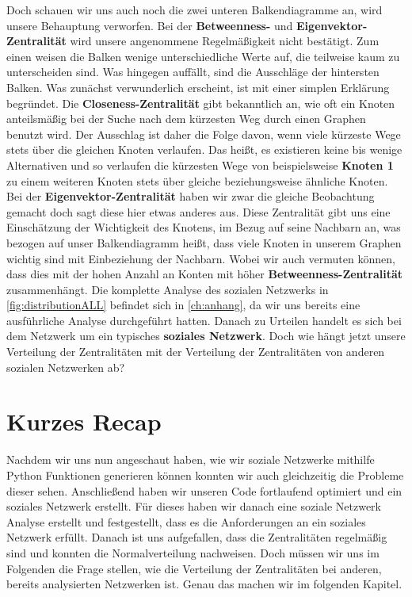 Doch schauen wir uns auch noch die zwei unteren Balkendiagramme an, wird unsere Behauptung verworfen. Bei der \textbf{Betweenness-} und \textbf{Eigenvektor-Zentralität} wird unsere angenommene Regelmäßigkeit nicht bestätigt. Zum einen weisen die Balken wenige unterschiedliche Werte auf, die teilweise kaum zu unterscheiden sind. Was hingegen auffällt, sind die Ausschläge der hintersten Balken. Was zunächst verwunderlich erscheint, ist mit einer simplen Erklärung begründet. Die \textbf{Closeness-Zentralität} gibt bekanntlich an, wie oft ein Knoten anteilsmäßig bei der Suche nach dem kürzesten Weg durch einen Graphen benutzt wird. Der Ausschlag ist daher die Folge davon, wenn viele kürzeste Wege stets über die gleichen Knoten verlaufen. Das heißt, es existieren keine bis wenige Alternativen und so verlaufen die kürzesten Wege von beispielsweise \textbf{Knoten 1} zu einem weiteren Knoten stets über gleiche beziehungsweise ähnliche Knoten. Bei der \textbf{Eigenvektor-Zentralität} haben wir zwar die gleiche Beobachtung gemacht doch sagt diese hier etwas anderes aus. Diese Zentralität gibt uns eine Einschätzung der Wichtigkeit des Knotens, im Bezug auf seine Nachbarn an, was bezogen auf unser Balkendiagramm heißt, dass viele Knoten in unserem Graphen wichtig sind mit Einbeziehung der Nachbarn. Wobei wir auch vermuten können, dass dies mit der hohen Anzahl an Konten mit höher \textbf{Betweenness-Zentralität} zusammenhängt. 
Die komplette Analyse des sozialen Netzwerks in \ref{fig:distributionALL} befindet sich in \ref{ch:anhang}, da wir uns bereits eine ausführliche Analyse durchgeführt hatten. Danach zu Urteilen handelt es sich bei dem Netzwerk um ein typisches \textbf{soziales Netzwerk}. Doch wie hängt jetzt unsere Verteilung der Zentralitäten mit der Verteilung der Zentralitäten von anderen sozialen Netzwerken ab? 

\section{Kurzes Recap}
Nachdem wir uns nun angeschaut haben, wie wir soziale Netzwerke mithilfe Python Funktionen generieren können konnten wir auch gleichzeitig die Probleme dieser sehen. Anschließend haben wir unseren Code fortlaufend optimiert und ein soziales Netzwerk erstellt. Für dieses haben wir danach eine soziale Netzwerk Analyse erstellt und festgestellt, dass es die Anforderungen an ein soziales Netzwerk erfüllt. Danach ist uns aufgefallen, dass die Zentralitäten regelmäßig sind und konnten die Normalverteilung nachweisen. Doch müssen wir uns im Folgenden die Frage stellen, wie die Verteilung der Zentralitäten bei anderen, bereits analysierten Netzwerken ist. Genau das machen wir im folgenden Kapitel.

